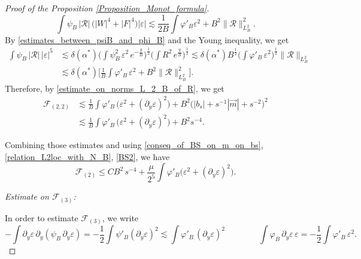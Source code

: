 \documentclass[16pt,english, oneside,reqno]{smfart}
\newcommand{\vare}{{\varepsilon}}
\newcommand{\vphi}{{\varphi}}
\begin{document}
\begin{proof}[Proof of the Proposition \ref{Proposition_Monot_formula}]
\begin{equation}
     \int \psi_B\, |\mathcal{R}|\,\big( |W|^4 + |F|^4 \big) |\vare| \lesssim \frac{1}{2B}\int \vphi'_B \vare^2 +  B^2 \|\mathcal{R}\|^2_{L^2_B}.
\end{equation}
By \eqref{estimates_between_psiB_and_phi_B} and the Young inequality, we get
\begin{equation}
\begin{split}
    \int \psi_B\, |\mathcal{R}|\, |\vare|^5 
    & \lesssim \delta(\alpha^*)\Big(\int \psi^2_B \,\vare^2 \,e^{-\frac{y}{B}} \Big)^{\frac{1}{2}} \Big( \int R^2 \, e^{\frac{y}{B}}\Big)^{\frac{1}
    {2}}
    \lesssim \delta(\alpha^*)B^{\frac{1}{2}}\Big(\int \vphi'_B \,\vare^2 \Big)^{\frac{1}{2}} \|\mathcal{R}\|_{L^2_B}\\
    & \lesssim \delta(\alpha^*)\Big[\frac{1}{B}\int \vphi'_B\, \vare^2 + B^2 \|\mathcal{R}\|^2_{L^2_B} \Big].
\end{split}
\end{equation}
Therefore, by \eqref{estimate_on_norms_L_2_B_of_R}, we get
\begin{equation}
\begin{split}
    \mathcal{F}_{(2,2)} 
    & \lesssim \frac{1}{B}\int \vphi'_B \,\big( \vare^2 + (\partial_y\vare)^2 \big) + B^2 \big( |b_s|+s^{-1}|\vec{m}| + s^{-2} \big)^2\\
    & \lesssim \frac{1}{B}\int \vphi'_B \,\big( \vare^2+(\partial_y \vare)^2 \big) + B^2 s^{-4}.
\end{split}
\end{equation}

Combining those estimates and using \eqref{conseq_of_BS_on_m_on_bs}, \eqref{relation_L2loc_with_N_B}, \eqref{BS2}, we have
\begin{equation}\label{mathcalF_estim_onF2}
     \mathcal{F}_{(2)}  \leq C B^2 \, s^{-4} + \frac{\mu}{2^{5}}\int \vphi'_B \big( \vare^2 + (\partial_y \vare)^2 \big).
\end{equation}


\textit{Estimate on $\mathcal{F}_{(3)}$:}

In order to estimate $\mathcal{F}_{(3)}$, we write
\begin{equation}
    -\int \partial_y \vare \, \partial_y (\psi_B\, \partial_y \vare) = -\frac{1}{2}\int \psi'_B (\partial_y \vare)^2 \lesssim \int \vphi'_B\, (\partial_y \vare)^2  \qquad \qquad \int \vphi_B\, \partial_y \vare \, \vare = -\frac{1}{2}\int \vphi'_B \, \vare^2.
\end{equation}


\end{proof}
\end{document}
